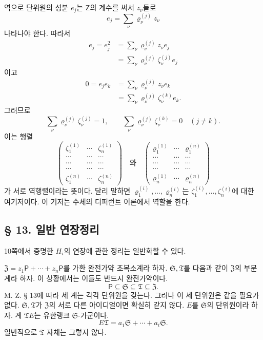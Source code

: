역으로 단위원의 성분 \(e_j\)는 \(\mathsf Z\)의 계수를 써서 \(z_\nu\)들로
\[
        e_j=\sum_\nu\varrho_\nu^{(j)}z_\nu
\]
나타나야 한다. 따라서
\[
\begin{aligned}
e_j=e_j^2
&=\sum_\nu\varrho_\nu^{(j)}z_\nu e_j\\
&=\sum_\nu\varrho_\nu^{(j)}
  \zeta_\nu^{(j)}e_j
\end{aligned}
\]
이고
\[
\begin{aligned}
0=e_je_k
&=\sum_\nu\varrho_\nu^{(j)}z_\nu e_k\\
&=\sum_\nu\varrho_\nu^{(j)}
  \zeta_\nu^{(k)}e_k.
\end{aligned}
\]
그러므로
\[
        \sum_\nu\varrho_\nu^{(j)}\zeta_\nu^{(j)}=1,
        \qquad
        \sum_\nu\varrho_\nu^{(j)}\zeta_\nu^{(k)}=0
        \quad(j\ne k).
\]
이는 행렬
\[
\begin{pmatrix}
\zeta_1^{(1)}&\cdots&\zeta_n^{(1)}\\
\cdots&\cdots&\cdots\\
\cdots&\cdots&\cdots\\
\cdots&\cdots&\cdots\\
\zeta_1^{(n)}&\cdots&\zeta_n^{(n)}
\end{pmatrix}
\quad\text{와}\quad
\begin{pmatrix}
\varrho_1^{(1)}&\cdots&\varrho_1^{(n)}\\
\cdots&\cdots&\cdots\\
\cdots&\cdots&\cdots\\
\cdots&\cdots&\cdots\\
\varrho_n^{(1)}&\cdots&\varrho_n^{(n)}
\end{pmatrix}
\]
가 서로 역행렬이라는 뜻이다. 달리 말하면 \(\varrho_1^{(i)},\ldots,\varrho_n^{(i)}\)는 \(\zeta_1^{(i)},\ldots,\zeta_n^{(i)}\)에 대한 여기저이다. 이 기저는 수체의 디퍼런트 이론에서 역할을 한다.

\subsection*{§ 13. 일반 연장정리}

10쪽에서 증명한 \(H_i\)의 연장에 관한 정리는 일반화할 수 있다.

\(\mathfrak Z=z_1\mathsf P+\cdots+z_n\mathsf P\)를 가환 완전가약 초복소계라 하자. \(\mathfrak S,\mathfrak T\)를 다음과 같이 \(\mathfrak Z\)의 부분계라 하자. 이 상황에서는 이들도 반드시 완전가약이다.
\[
        \mathsf P\subseteq\mathfrak S
        \subseteq\mathfrak T\subseteq\mathfrak Z.
\]
M. Z. § 13에 따라 세 계는 각각 단위원을 갖는다. 그러나 이 세 단위원은 같을 필요가 없다. \(\mathfrak S,\mathfrak T\)가 \(\mathfrak Z\)의 서로 다른 아이디얼이면 확실히 같지 않다. \(E\)를 \(\mathfrak S\)의 단위원이라 하자. 계 \(\mathfrak T E\)는 유한랭크 \(\mathfrak S\)-가군이다.
\[
        E\mathfrak T
        =a_1\mathfrak S+\cdots+a_t\mathfrak S.
\]
일반적으로 \(\mathfrak T\) 자체는 그렇지 않다.

